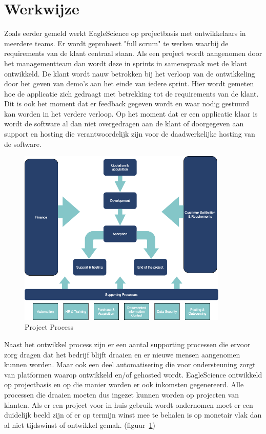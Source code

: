 \section{Werkwijze}\label{sec:werkwijze}

Zoals eerder gemeld werkt EagleScience op projectbasis met ontwikkelaars in meerdere teams. Er wordt geprobeert "full scrum" te werken waarbij de requirements van de klant centraal staan. Als een project wordt aangenomen door het managementteam dan wordt deze in sprints in samenspraak met de klant ontwikkeld. De klant wordt nauw betrokken bij het verloop van de ontwikkeling door het geven van demo's aan het einde van iedere sprint. Hier wordt gemeten hoe de applicatie zich gedraagt met betrekking tot de requirements van de klant. Dit is ook het moment dat er feedback gegeven wordt en waar nodig gestuurd kan worden in het verdere verloop. Op het moment dat er een applicatie klaar is wordt de software al dan niet overgedragen aan de klant of doorgegeven aan support en hosting die verantwoordelijk zijn voor de daadwerkelijke hosting van de software.

\begin{figure}[bth]
\myfloatalign
\includegraphics[width=10cm]{gfx/ProcessFlow}
\caption{Project Process}
\label{fig:Project Process}
\end{figure}

Naast het ontwikkel process zijn er een aantal supporting processen die ervoor zorg dragen dat het bedrijf blijft draaien en er nieuwe mensen aangenomen kunnen worden. Maar ook een deel automatisering die voor ondersteuning zorgt van platformen waarop ontwikkeld en/of gehosted wordt.  EagleScience ontwikkeld op projectbasis en op die manier worden er ook inkomsten gegenereerd. Alle processen die draaien moeten dus ingezet kunnen worden op projecten van klanten. Als er een project voor in huis gebruik wordt ondernomen moet er een duidelijk beeld zijn of er op termijn winst mee te behalen is op monetair vlak dan al niet tijdswinst of ontwikkel gemak. (figuur~\ref{fig:Project Process})

